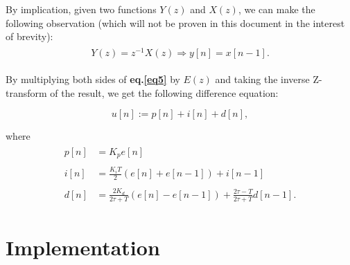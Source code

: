 \documentclass[11pt]{article}
\theoremstyle{definition}
\begin{document}
By implication, given two functions $Y(z)$ and $X(z)$, we can make the following observation (which will not be proven in this document in
the interest of brevity):
\begin{align*}
\begin{split}
    Y(z) = z^{-1}X(z) \Rightarrow y[n] = x[n-1].
\end{split}
\end{align*}

By multiplying both sides of \textbf{eq.\ref{eq5}} by $E(z)$ and taking the inverse Z-transform of the result, we get the following difference equation:

\begin{equation} \label{eq6}
\boxed{
    u[n] := p[n] + i[n] + d[n],
}
\end{equation}

where
\begin{align*}
\begin{split}
    p[n] &= K_{p}e[n] \\\\
    i[n] &= \frac{K_{i}T}{2}\left(e[n] + e[n-1]\right) + i[n-1] \\\\
    d[n] &= \frac{2K_{d}}{2\tau + T}\left(e[n] - e[n-1]\right) + \frac{2\tau - T}{2\tau + T}d[n-1].
\end{split}
\end{align*}

\section{Implementation}
\end{document}
